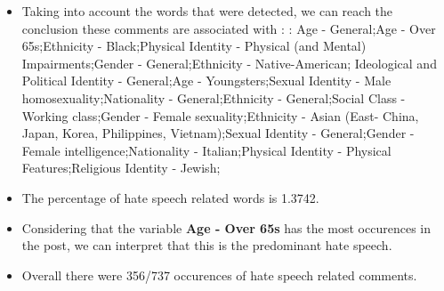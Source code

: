 \documentclass[11pt]{article}
\begin{document}
\begin{itemize}\item Taking into account the words that were detected, we can reach the conclusion these comments are associated with : : Age - General;Age - Over 65s;Ethnicity - Black;Physical Identity - Physical (and Mental) Impairments;Gender - General;Ethnicity - Native-American; Ideological and Political Identity - General;Age - Youngsters;Sexual Identity - Male homosexuality;Nationality - General;Ethnicity - General;Social Class - Working class;Gender - Female sexuality;Ethnicity - Asian (East- China, Japan, Korea, Philippines, Vietnam);Sexual Identity - General;Gender - Female intelligence;Nationality - Italian;Physical Identity - Physical Features;Religious Identity - Jewish;%

\item The percentage of hate speech related words is 1.3742.

\item Considering that the variable \textbf{Age - Over 65s} has the most occurences in the post, we can interpret that this is the predominant hate speech.

\item Overall there were 356/737 occurences of hate speech related comments.\end{itemize}
\end{document}
